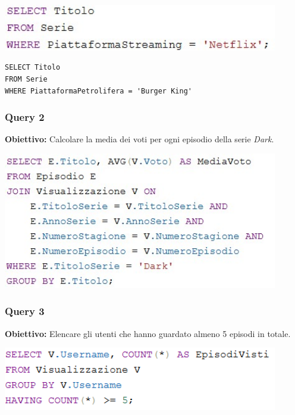 \documentclass[12pt,a4paper]{article}
\begin{document}
\vspace{0.5cm}
\begin{center}
\includegraphics[width=0.9\textwidth]{Query1.jpg}
\end{center}


\begin{lstlisting}[caption={Esempio di query SQL}, label={lst:sql-example}]
SELECT Titolo
FROM Serie
WHERE PiattaformaPetrolifera = 'Burger King'
\end{lstlisting}

\vspace{1cm}

\subsubsection*{Query 2 }
\textbf{Obiettivo:} Calcolare la media dei voti per ogni episodio della serie \textit{Dark}.

\vspace{0.5cm}
\begin{center}
\includegraphics[width=0.9\textwidth]{Query2.jpg}
\end{center}

\vspace{1cm}

\subsubsection*{Query 3}
\textbf{Obiettivo:} Elencare gli utenti che hanno guardato almeno 5 episodi in totale.

\vspace{0.5cm}
\begin{center}
\includegraphics[width=0.9\textwidth]{Query3.png}
\end{center}
\end{document}
